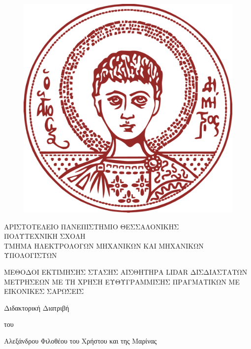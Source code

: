 \begin{center}

  \begin{figure}\centering\vspace{-2cm}
    \includegraphics[scale=0.2]{./figures/parts/00/auth_logo.png}
  \end{figure}


  {ΑΡΙΣΤΟΤΕΛΕΙΟ ΠΑΝΕΠΙΣΤΗΜΙΟ ΘΕΣΣΑΛΟΝΙΚΗΣ\\
   \vspace{-0.2cm}
   ΠΟΛΥΤΕΧΝΙΚΗ ΣΧΟΛΗ\\
   \vspace{-0.2cm}
   ΤΜΗΜΑ ΗΛΕΚΤΡΟΛΟΓΩΝ ΜΗΧΑΝΙΚΩΝ ΚΑΙ ΜΗΧΑΝΙΚΩΝ ΥΠΟΛΟΓΙΣΤΩΝ} \\

   \vspace{2cm}

   {\large ΜΕΘΟΔΟΙ ΕΚΤΙΜΗΣΗΣ ΣΤΑΣΗΣ ΑΙΣΘΗΤΗΡΑ LIDAR ΔΙΣΔΙΑΣΤΑΤΩΝ ΜΕΤΡΗΣΕΩΝ ΜΕ ΤΗ ΧΡΗΣΗ ΕΥΘΥΓΡΑΜΜΙΣΗΣ ΠΡΑΓΜΑΤΙΚΩΝ ΜΕ ΕΙΚΟΝΙΚΕΣ ΣΑΡΩΣΕΙΣ}

   \vspace{1.7cm}

   {Διδακτορική Διατριβή}

   {του}

   {Αλεξάνδρου Φιλοθέου του Χρήστου και της Μαρίνας}


\end{center}

